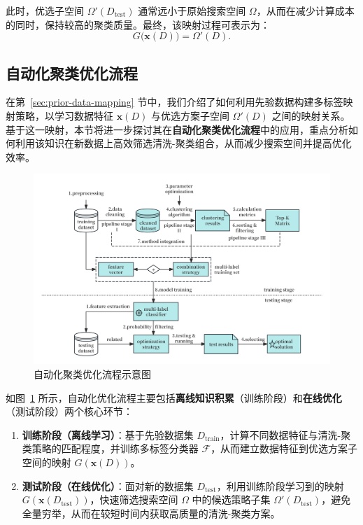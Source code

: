 \documentclass[10pt]{article} %
\numberwithin{equation}{section}
\begin{document}
此时，优选子空间 $\Omega'(D_{\text{test}})$ 通常远小于原始搜索空间 $\Omega$，从而在减少计算成本的同时，保持较高的聚类质量。最终，该映射过程可表示为：
\begin{equation}\label{eq:mapping-function}
G\bigl(\mathbf{x}(D)\bigr) = \Omega'(D).
\end{equation}

\subsection{自动化聚类优化流程}
\label{sec:autocluster-process}

在第~\ref{sec:prior-data-mapping} 节中，我们介绍了如何利用先验数据构建多标签映射策略，以学习数据特征 $\mathbf{x}(D)$ 与优选方案子空间 $\Omega'(D)$ 之间的映射关系。基于这一映射，本节将进一步探讨其在\textbf{自动化聚类优化流程}中的应用，重点分析如何利用该知识在新数据上高效筛选清洗-聚类组合，从而减少搜索空间并提高优化效率。

\begin{figure}[htbp]
  \centering
  \includegraphics[width=0.85\linewidth]{figures/autocluster_workflow.png}
  \caption{自动化聚类优化流程示意图}
  \label{fig:autocluster-workflow}
\end{figure}

如图~\ref{fig:autocluster-workflow} 所示，自动化优化流程主要包括\textbf{离线知识积累}（训练阶段）和\textbf{在线优化}（测试阶段）两个核心环节： \begin{enumerate} \item \textbf{训练阶段（离线学习）}：基于先验数据集 $D_{\text{train}}$，计算不同数据特征与清洗-聚类策略的匹配程度，并训练多标签分类器 $\mathcal{F}$，从而建立数据特征到优选方案子空间的映射 $G(\mathbf{x}(D))$。 \item \textbf{测试阶段（在线优化）}：面对新的数据集 $D_{\text{test}}$，利用训练阶段学习到的映射 $G(\mathbf{x}(D_{\text{test}}))$，快速筛选搜索空间 $\Omega$ 中的候选策略子集 $\Omega'(D_{\text{test}})$，避免全量穷举，从而在较短时间内获取高质量的清洗-聚类方案。 \end{enumerate}
\end{document}

